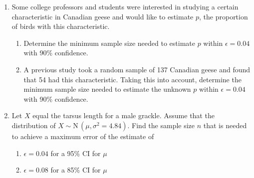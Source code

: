 \documentclass{article}
\newcommand{\follow}[1]{\sim \text{#1}\,}		%
\begin{document}
\begin{enumerate}
    \item Some college professors and students were interested in studying a certain characteristic in Canadian geese and would like to estimate $p$, the proportion of birds with this characteristic.%
    \begin{enumerate}
        \item Determine the minimum sample size needed to estimate $p$ within $\epsilon = 0.04$ with 90\% confidence.\vspace{30pt}%
        \item A previous study took a random sample of 137 Canadian geese and found that 54 had this characteristic. Taking this into account, determine the minimum sample size needed to estimate the unknown $p$ within $\epsilon = 0.04$ with 90\% confidence.\vspace{30pt}%
    \end{enumerate}
    
    \item Let $X$ equal the tarsus length for a male grackle. Assume that the distribution of $X \follow{N}(\mu, \sigma^2 = 4.84)$. Find the sample size $n$ that is needed to achieve a maximum error of the estimate of%
    \begin{enumerate}
        \item $\epsilon = 0.04$ for a 95\% CI for $\mu$\vspace{40pt}
        \item $\epsilon = 0.08$ for a 85\% CI for $\mu$\vspace{40pt}
    \end{enumerate}
        
\end{enumerate}
\end{document}
